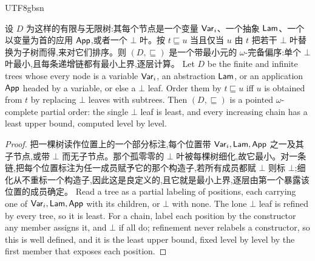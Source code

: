 \begin{CJK*}{UTF8}{gbsn}
  \begin{lemma}\label{lem:order-llt}
    \ifTablambdaChinese
    设 $D$ 为这样的有限与无限树:其每个节点是一个变量 $\mathsf{Var}_i$、一个抽象 $\mathsf{Lam}$、一个以变量为首的应用 $\mathsf{App}$,或者一个 $\bot$ 叶。按 $t \sqsubseteq u$ 当且仅当 $u$ 由 $t$ 把若干 $\bot$ 叶替换为子树而得,来对它们排序。则 $(D, \sqsubseteq)$ 是一个带最小元的 $\omega$-完备偏序:单个 $\bot$ 叶最小,且每条递增链都有最小上界,逐层计算。
    \else
    Let $D$ be the finite and infinite trees whose every node is a variable $\mathsf{Var}_i$, an abstraction
    $\mathsf{Lam}$, or an application $\mathsf{App}$ headed by a variable, or else a $\bot$ leaf. Order them by
    $t \sqsubseteq u$ iff $u$ is obtained from $t$ by replacing $\bot$ leaves with subtrees. Then
    $(D, \sqsubseteq)$ is a pointed $\omega$-complete partial order: the single $\bot$ leaf is least, and
    every increasing chain has a least upper bound, computed level by level.
    \fi
  \end{lemma}
  \begin{proof}
    \ifTablambdaChinese
    把一棵树读作位置上的一个部分标注,每个位置带 $\mathsf{Var}_i, \mathsf{Lam}, \mathsf{App}$ 之一及其子节点,或带 $\bot$ 而无子节点。那个孤零零的 $\bot$ 叶被每棵树细化,故它最小。对一条链,把每个位置标注为任一成员赋予它的那个构造子,若所有成员都赋 $\bot$ 则标 $\bot$;细化从不重标一个构造子,因此这是良定义的,且它就是最小上界,逐层由第一个暴露该位置的成员确定。
    \else
    Read a tree as a partial labeling of positions, each carrying one of $\mathsf{Var}_i, \mathsf{Lam}, \mathsf{App}$
    with its children, or $\bot$ with none. The lone $\bot$ leaf is refined by every tree, so it is
    least. For a chain, label each position by the constructor any member assigns it, and $\bot$ if all
    do; refinement never relabels a constructor, so this is well defined, and it is the least upper
    bound, fixed level by level by the first member that exposes each position.
    \fi
  \end{proof}


\end{CJK*}

